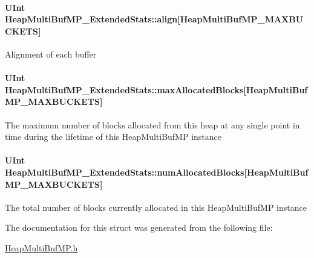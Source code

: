 \paragraph[{align}]{\setlength{\rightskip}{0pt plus 5cm}U\-Int Heap\-Multi\-Buf\-M\-P\-\_\-\-Extended\-Stats\-::align\mbox{[}{\bf Heap\-Multi\-Buf\-M\-P\-\_\-\-M\-A\-X\-B\-U\-C\-K\-E\-T\-S}\mbox{]}}\label{struct_heap_multi_buf_m_p___extended_stats_a6ba215fe07dc8a00e8eb8cf75cf1d81c}
Alignment of each buffer 
\paragraph[{max\-Allocated\-Blocks}]{\setlength{\rightskip}{0pt plus 5cm}U\-Int Heap\-Multi\-Buf\-M\-P\-\_\-\-Extended\-Stats\-::max\-Allocated\-Blocks\mbox{[}{\bf Heap\-Multi\-Buf\-M\-P\-\_\-\-M\-A\-X\-B\-U\-C\-K\-E\-T\-S}\mbox{]}}\label{struct_heap_multi_buf_m_p___extended_stats_af3ef9e5df01faaffdead0223f75b9884}
The maximum number of blocks allocated from this heap at any single point in time during the lifetime of this Heap\-Multi\-Buf\-M\-P instance 
\paragraph[{num\-Allocated\-Blocks}]{\setlength{\rightskip}{0pt plus 5cm}U\-Int Heap\-Multi\-Buf\-M\-P\-\_\-\-Extended\-Stats\-::num\-Allocated\-Blocks\mbox{[}{\bf Heap\-Multi\-Buf\-M\-P\-\_\-\-M\-A\-X\-B\-U\-C\-K\-E\-T\-S}\mbox{]}}\label{struct_heap_multi_buf_m_p___extended_stats_a6e1fab6694ccbea899c34a9c11e207e4}
The total number of blocks currently allocated in this Heap\-Multi\-Buf\-M\-P instance 

The documentation for this struct was generated from the following file\-:\begin{DoxyCompactItemize}
\item 
\hyperlink{_heap_multi_buf_m_p_8h}{Heap\-Multi\-Buf\-M\-P.\-h}\end{DoxyCompactItemize}
